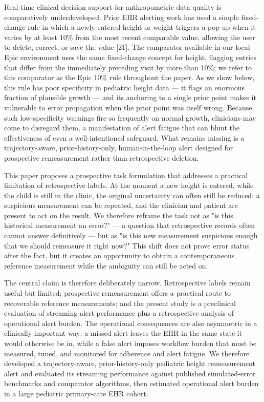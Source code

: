 \documentclass[11pt]{article}
\begin{document}
Real-time clinical decision support for anthropometric data quality is comparatively underdeveloped. Prior EHR alerting work has used a simple fixed-change rule in which a newly entered height or weight triggers a pop-up when it varies by at least 10\% from the most recent comparable value, allowing the user to delete, correct, or save the value [21]. The comparator available in our local Epic environment uses the same fixed-change concept for height, flagging entries that differ from the immediately preceding visit by more than 10\%; we refer to this comparator as the Epic 10\% rule throughout the paper. As we show below, this rule has poor specificity in pediatric height data --- it flags an enormous fraction of plausible growth --- and its anchoring to a single prior point makes it vulnerable to error propagation when the prior point was itself wrong. Because such low-specificity warnings fire so frequently on normal growth, clinicians may come to disregard them, a manifestation of alert fatigue that can blunt the effectiveness of even a well-intentioned safeguard. What remains missing is a trajectory-aware, prior-history-only, human-in-the-loop alert designed for prospective remeasurement rather than retrospective deletion.

This paper proposes a prospective task formulation that addresses a practical limitation of retrospective labels. At the moment a new height is entered, while the child is still in the clinic, the original uncertainty can often still be reduced: a suspicious measurement can be repeated, and the clinician and patient are present to act on the result. We therefore reframe the task not as "is this historical measurement an error?" --- a question that retrospective records often cannot answer definitively --- but as "is this new measurement suspicious enough that we should remeasure it right now?" This shift does not prove error status after the fact, but it creates an opportunity to obtain a contemporaneous reference measurement while the ambiguity can still be acted on.

The central claim is therefore deliberately narrow. Retrospective labels remain useful but limited; prospective remeasurement offers a practical route to recoverable reference measurements; and the present study is a preclinical evaluation of streaming alert performance plus a retrospective analysis of operational alert burden. The operational consequences are also asymmetric in a clinically important way: a missed alert leaves the EHR in the same state it would otherwise be in, while a false alert imposes workflow burden that must be measured, tuned, and monitored for adherence and alert fatigue. We therefore developed a trajectory-aware, prior-history-only pediatric height remeasurement alert and evaluated its streaming performance against published simulated-error benchmarks and comparator algorithms, then estimated operational alert burden in a large pediatric primary-care EHR cohort.
\end{document}
